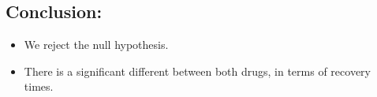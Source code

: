 \documentclass[a4paper,12pt]{article}
\begin{document}
\subsection*{Conclusion:} 
\begin{itemize}
    \item We reject the null hypothesis. 
    \item There is a significant different between both drugs, in terms of recovery times.
\end{itemize}
\end{document}
